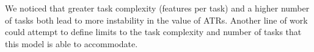 \documentclass[10pt,letterpaper]{article}
\begin{document}
We noticed that greater task complexity (features per task) and a higher number of tasks both lead to more instability in the value of ATRs. Another line of work could attempt to define limits to the task complexity and number of tasks that this model is able to accommodate.

\setlength{\bibleftmargin}{.125in}
\setlength{\bibindent}{-\bibleftmargin}



\end{document}
